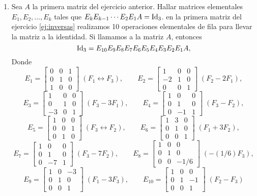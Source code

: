 \begin{enumerate}[topsep=6pt,itemsep=.4cm]
\item Sea $A$ la primera matriz del ejercicio anterior.
Hallar matrices elementales $E_1,E_2,\dots,E_k$ tales que $E_kE_{k-1}\cdots E_2E_1A=\operatorname{Id}_3$.
\rta en  la primera matriz del ejercicio \ref{ej:inversas} realizamos 10 operaciones elementales de fila para llevar la matriz a la identidad. Si llamamos a la matriz $A$, entonces
$$
\operatorname{Id}_3= E_{10}E_9E_8E_7E_6E_5E_4E_3E_2E_1A,
$$
Donde 
$$
    E_1 = \begin{bmatrix} 0&0&1 \\    0&1&0 \\ 1&0&0\end{bmatrix}\;(F_1 \leftrightarrow F_3) ,\qquad
    E_2 = \begin{bmatrix} 1&0&0 \\    -2&1&0 \\ 0&0&1\end{bmatrix}\; (F_2-2F_1),
$$
$$    
    E_3 = \begin{bmatrix} 1&0&0 \\    0&1&0 \\ -3&0&1\end{bmatrix}\; (F_3-3F_1),\qquad 
    E_4 = \begin{bmatrix} 1&0&0 \\    0&1&0 \\ 0&-1&1\end{bmatrix}\; (F_3-F_2),
$$
$$
    E_5 = \begin{bmatrix} 1&0&0 \\    0&0&1 \\ 0&1&0\end{bmatrix}\; (F_3 \leftrightarrow F_2),\qquad 
    E_6 = \begin{bmatrix} 1&3&0 \\    0&1&0 \\ 0&0&1\end{bmatrix}\; (F_1 +3F_2),
$$
$$
    E_7 = \begin{bmatrix} 1&0&0 \\    0&1&0 \\ 0&-7&1\end{bmatrix}\; (F_3-7F_2),\qquad 
    E_8 = \begin{bmatrix} 1&0&0 \\    0&1&0 \\ 0&0&-1/6\end{bmatrix}\; (-(1/6)F_3),
$$
$$
    E_9 = \begin{bmatrix} 1&0&-3 \\    0&1&0 \\ 0&0&1\end{bmatrix}\; (F_1-3F_3),\qquad 
    E_{10} = \begin{bmatrix} 1&0&0 \\    0&1&-1 \\ 0&0&1\end{bmatrix}\; (F_2-F_3)
$$


\end{enumerate}
